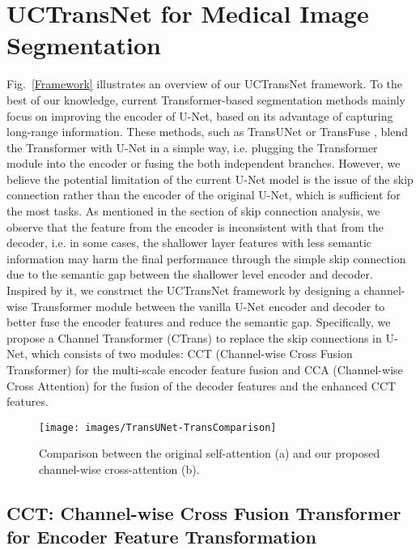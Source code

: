\documentclass[letterpaper]{article} \usepackage{aaai22}  \usepackage{times}  \usepackage{helvet}  \usepackage{courier}  \usepackage[hyphens]{url}  \usepackage{graphicx} \urlstyle{rm} \def\UrlFont{\rm}  \usepackage{natbib}  \usepackage{caption} \DeclareCaptionStyle{ruled}{labelfont=normalfont,labelsep=colon,strut=off} \frenchspacing  \setlength{\pdfpagewidth}{8.5in}  \setlength{\pdfpageheight}{11in}  \usepackage{algorithm}
\begin{document}
	
	
	
	
	
	\section{UCTransNet for Medical Image Segmentation}
	
	Fig.~\ref{Framework} illustrates an overview of our UCTransNet framework.
	To the best of our knowledge, current Transformer-based segmentation methods mainly focus on improving the encoder of U-Net, based on its advantage of capturing long-range information. These methods, such as TransUNet \cite{TransUNetTransformersMake_2021} or TransFuse \cite{TransFuseFusingTransformers_2021},  blend the Transformer with U-Net in a simple way, i.e. plugging the Transformer module into the encoder or fusing the both independent branches.
	However, we believe the potential limitation of the current U-Net model is the issue of the skip connection rather than  the encoder of the original U-Net, which is sufficient for the most tasks. 
	As mentioned in the section of skip connection analysis, we observe that the feature from the encoder is inconsistent with that from the decoder, i.e. in some cases, the  shallower layer features with less semantic information  may harm the final performance through the simple skip connection due to the semantic gap between the shallower level encoder and decoder. 
	Inspired by it, we construct the  UCTransNet framework by designing a   channel-wise Transformer module between the vanilla U-Net encoder and decoder to better fuse the encoder features and reduce the semantic gap. Specifically,
	we propose a Channel Transformer (CTrans) to replace the skip connections in U-Net, which consists of two modules: CCT (Channel-wise Cross Fusion Transformer) for the multi-scale encoder feature fusion and CCA (Channel-wise Cross Attention) for the fusion of the decoder features and the enhanced CCT features.
	
	\begin{figure}[t]
		\centering
		\texttt{[image: images/TransUNet-TransComparison]} \caption{Comparison between the original self-attention (a) and our proposed channel-wise cross-attention (b).}
		\label{TransComparison}
	\end{figure}
	
	
	\subsection{CCT: Channel-wise Cross Fusion Transformer for Encoder Feature Transformation}
	
\end{document}
